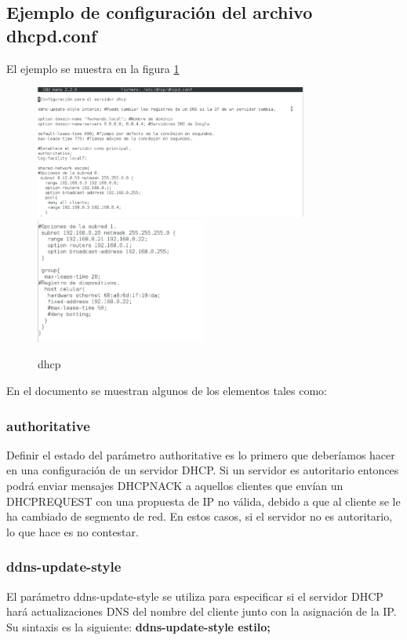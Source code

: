  	\subsection{Ejemplo de configuración del archivo dhcpd.conf}	
 	El ejemplo se muestra en la figura \ref{fig:3}
\begin{figure}
  \centering
    \includegraphics[width=0.8\textwidth]{img/dhcp1}
    \includegraphics[width=0.5\textwidth]{img/dhcp2}
  \caption{dhcp}
  \label{fig:3}
\end{figure}
En el documento se muestran algunos de los elementos tales como:
\subsubsection{authoritative}
Definir el estado del parámetro authoritative es lo primero que deberíamos hacer en una configuración de un servidor DHCP. Si un servidor es autoritario entonces podrá enviar mensajes DHCPNACK a aquellos clientes que envían un DHCPREQUEST con una propuesta de IP no válida, debido a que al cliente se le ha cambiado de segmento de red. En estos casos, si el servidor no es autoritario, lo que hace es no contestar.

\subsubsection{ddns-update-style}
El parámetro ddns-update-style se utiliza para especificar si el servidor DHCP hará actualizaciones DNS del nombre del cliente junto con la asignación de la IP. Su sintaxis es la siguiente: \textbf{ddns-update-style estilo;}\\


